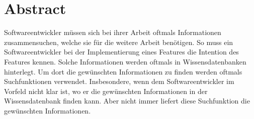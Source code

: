%
%
%
%
%
%
%
%
\section*{Abstract}
Softwareentwickler müssen sich bei ihrer Arbeit oftmals Informationen zusammensuchen, welche sie für die weitere Arbeit benötigen.
So muss ein Softwareentwickler bei der Implementierung eines Features die Intention des Features kennen.
Solche Informationen werden oftmals in Wissensdatenbanken hinterlegt.
Um dort die gewünschten Informationen zu finden werden oftmals Suchfunktionen verwendet.
Insbesondere, wenn dem Softwareentwickler im Vorfeld nicht klar ist, wo er die gewünschten Informationen in der Wissensdatenbank finden kann.
Aber nicht immer liefert diese Suchfunktion die gewünschten Informationen.\\

